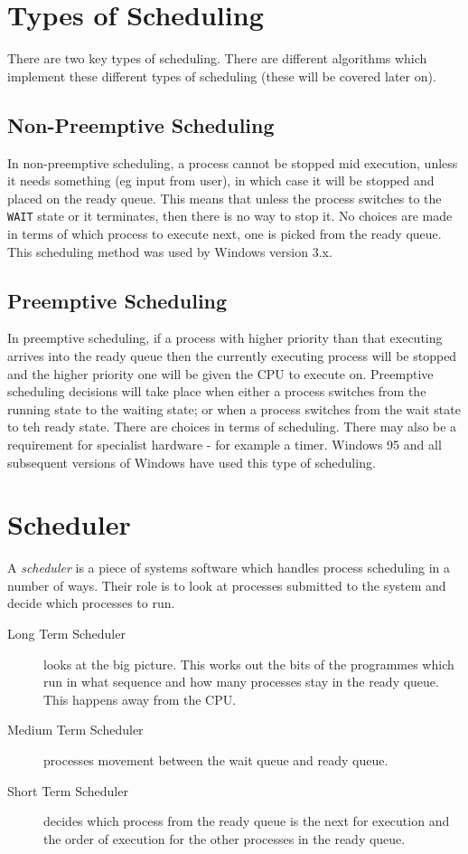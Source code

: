 \section{Types of Scheduling}
There are two key types of scheduling. There are different algorithms which implement these different types of scheduling (these will be covered later on).
\subsection{Non-Preemptive Scheduling}
In non-preemptive scheduling, a process cannot be stopped mid execution, unless it needs something (eg input from user), in which case it will be stopped and placed on the ready queue. This means that unless the process switches to the \verb|WAIT| state or it terminates, then there is no way to stop it. No choices are made in terms of which process to execute next, one is picked from the ready queue. This scheduling method was used by Windows version 3.x.

\subsection{Preemptive Scheduling}
In preemptive scheduling, if a process with higher priority than that executing arrives into the ready queue then the currently executing process will be stopped and the higher priority one will be given the CPU to execute on. Preemptive scheduling decisions will take place when either a process switches from the running state to the waiting state; or when a process switches from the wait state to teh ready state. There are choices in terms of scheduling. There may also be a requirement for specialist hardware - for example a timer. Windows 95 and all subsequent versions of Windows have used this type of scheduling. 

\section{Scheduler}
A \textit{scheduler} is a piece of systems software which handles process scheduling in a number of ways. Their role is to look at processes submitted to the system and decide which processes to run. 
\begin{description}
    \item[Long Term Scheduler] looks at the big picture. This works out the bits of the programmes which run in what sequence and how many processes stay in the ready queue. This happens away from the CPU. 
    \item[Medium Term Scheduler] processes movement between the wait queue and ready queue.
    \item[Short Term Scheduler] decides which process from the ready queue is the next for execution and the order of execution for the other processes in the ready queue. 
\end{description}

